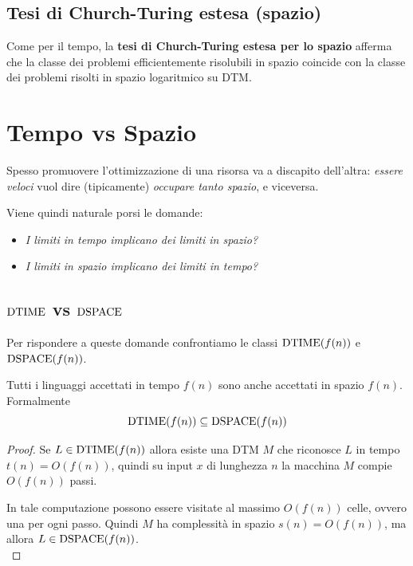 \subsection{Tesi di Church-Turing estesa (spazio)}

Come per il tempo, la \textbf{tesi di Church-Turing estesa per lo spazio} afferma che la classe dei problemi efficientemente risolubili in spazio coincide con la classe dei problemi risolti in spazio logaritmico su DTM. 

\section{Tempo vs Spazio}

Spesso promuovere l'ottimizzazione di una risorsa va a discapito dell'altra: \textit{essere veloci} vuol dire (tipicamente) \textit{occupare tanto spazio}, e viceversa.

Viene quindi naturale porsi le domande: 
\begin{itemize}
	\item \textit{I limiti in tempo implicano dei limiti in spazio?}
    
	\item \textit{I limiti in spazio implicano dei limiti in tempo?}
\end{itemize}

\subsection{$\text{DTIME}$ vs $\text{DSPACE}$}

Per rispondere a queste domande confrontiamo le classi $\text{DTIME} (f(n))$ e $\text{DSPACE} (f(n))$. \\

\begin{theor}
	Tutti i linguaggi accettati in tempo $f(n)$ sono anche accettati in spazio $f(n)$. Formalmente
	$$ \text{DTIME} (f(n)) \subseteq \text{DSPACE} (f(n)) $$
\end{theor}
\begin{proof}
	Se $L \in \text{DTIME}(f(n))$ allora esiste una DTM $M$ che riconosce $L$ in tempo $t(n) = O(f(n))$, quindi su input $x$ di lunghezza $n$ la macchina $M$ compie $O(f(n))$ passi.
	
	In tale computazione possono essere visitate al massimo $O(f(n))$ celle, ovvero una per ogni passo. Quindi $M$ ha complessità in spazio $s(n) = O(f(n))$, ma allora $L \in \text{DSPACE} (f(n))$.\\
\end{proof}

